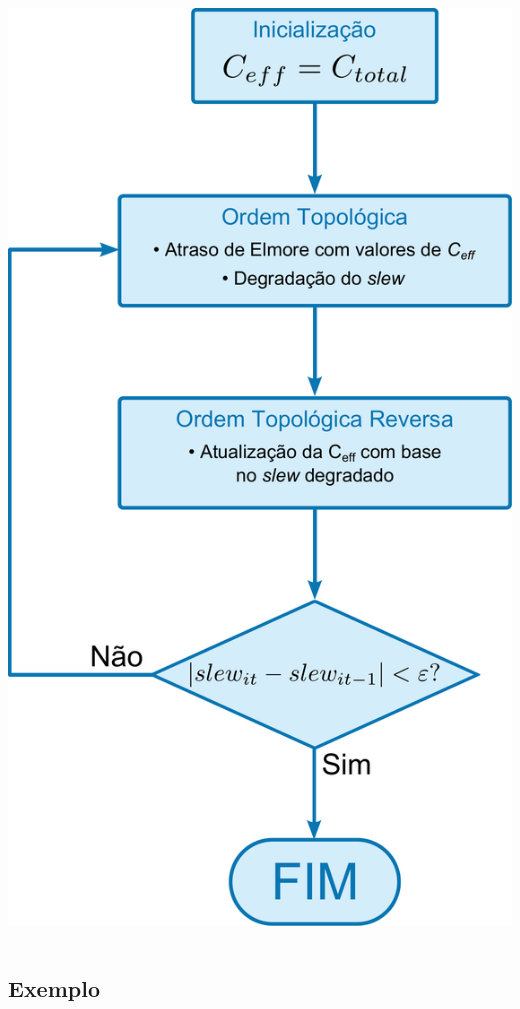 \documentclass[10pt,a4paper]{beamer}
\begin{document}
\begin{frame}[t]
\begin{center}
\begin{columns}
\begin{column}{0.37\textwidth}
						\includegraphics[width=\textwidth]{img/fluxograma.pdf} 
					\end{column}
				\end{columns}
			\end{center}
		\end{frame}


		\subsection*{Exemplo}
\end{document}
